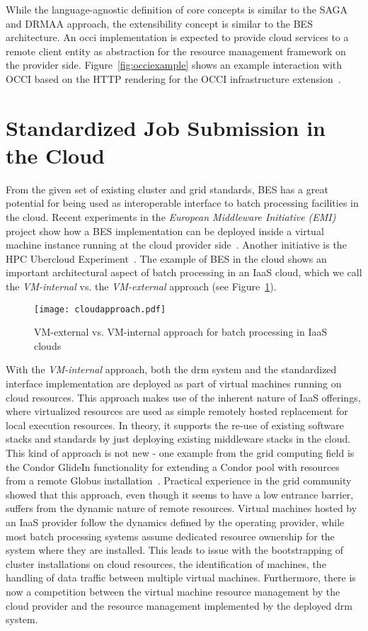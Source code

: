 \documentclass[twocolumn]{svjour3}       %
\begin{document}
While the language-agnostic definition of core concepts is similar to the SAGA and DRMAA approach, the extensibility concept is similar to the BES architecture. An \gls{occi} implementation is expected to provide cloud services to a remote client entity as abstraction for the resource management framework on the provider side. Figure~\ref{fig:occiexample} shows an example interaction with OCCI based on the HTTP rendering for the OCCI infrastructure extension~\cite{citemaster_9271}.

\section{Standardized Job Submission in the Cloud}
\label{sec:occidrmaa}

From the given set of existing cluster and grid standards, BES has a great potential for being used as interoperable interface to batch processing facilities in the cloud. Recent experiments in the \emph{European Middleware Initiative (EMI)} project show how a BES implementation can be deployed inside a virtual machine instance running at the cloud provider side~\cite{emi_bes}. Another initiative is the HPC Ubercloud Experiment~\cite{citemaster_9647}. The example of BES in the cloud shows an important architectural aspect of batch processing in an IaaS cloud, which we call the \emph{VM-internal} vs. the \emph{VM-external} approach (see Figure~\ref{fig:vmapproach}).  

\begin{figure}
  \texttt{[image: cloudapproach.pdf]}
\caption{VM-external vs. VM-internal approach for batch processing in IaaS clouds}
\label{fig:vmapproach} 
\end{figure}


With the \emph{VM-internal} approach, both the \gls{drm} system and the standardized interface implementation are deployed as part of virtual machines running on cloud resources. This approach makes use of the inherent nature of IaaS offerings, where virtualized resources are used as simple remotely hosted replacement for local execution resources. In theory, it supports the re-use of existing software stacks and standards by just deploying existing middleware stacks in the cloud. This kind of approach is not new - one example from the grid computing field is the Condor GlideIn functionality for extending a Condor pool with resources from a remote Globus installation~\cite{condorgrid}. Practical experience in the grid community showed that this approach, even though it seems to have a low entrance barrier, suffers from the dynamic nature of remote resources. Virtual machines hosted by an IaaS provider follow the dynamics defined by the operating provider, while most batch processing systems assume dedicated resource ownership for the system where they are installed. This leads to issue with the bootstrapping of cluster installations on cloud resources, the identification of machines, the handling of data traffic between multiple virtual machines. Furthermore, there is now a competition between the virtual machine resource management by the cloud provider and the resource management implemented by the deployed \gls{drm} system.
\end{document}
